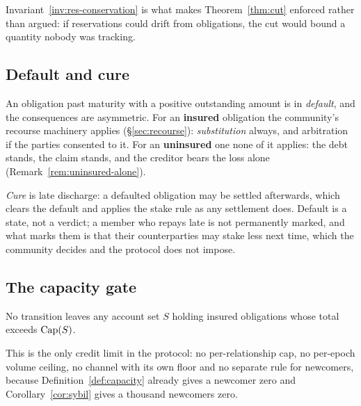 Invariant~\ref{inv:res-conservation} is what makes Theorem~\ref{thm:cut} enforced rather
than argued: if reservations could drift from obligations, the cut would bound a quantity
nobody was tracking.

\subsection{Default and cure}

An obligation past maturity with a positive outstanding amount is in \emph{default}, and
the consequences are asymmetric. For an \textbf{insured} obligation the community's
recourse machinery applies (\S\ref{sec:recourse}): \emph{substitution} always, and
arbitration if the parties consented to it. For an \textbf{uninsured} one none of it
applies: the debt stands, the claim stands, and the creditor bears the loss alone
(Remark~\ref{rem:uninsured-alone}).

\emph{Cure} is late discharge: a defaulted obligation may be settled afterwards, which
clears the default and applies the stake rule as any settlement does. Default is a state,
not a verdict; a member who repays late is not permanently marked, and what marks them is
that their counterparties may stake less next time, which the community decides and the
protocol does not impose.

\subsection{The capacity gate}

\begin{invariant}[Capacity]
\label{inv:capacity}
No transition leaves any account set $S$ holding insured obligations whose total exceeds
$\mathrm{Cap}(S)$.
\end{invariant}

This is the only credit limit in the protocol: no per-relationship cap, no per-epoch
volume ceiling, no channel with its own floor and no separate rule for newcomers, because
Definition~\ref{def:capacity} already gives a newcomer zero and Corollary~\ref{cor:sybil}
gives a thousand newcomers zero.
